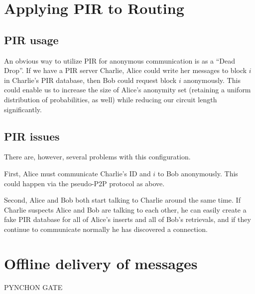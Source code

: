 \documentclass[twocolumn,11pt,english]{article}
\begin{document}
\section{Applying PIR to Routing}
\subsection{PIR usage}
An obvious way to utilize PIR for anonymous communication is as a ``Dead Drop''. If we have a PIR server Charlie, Alice could write her messages to block $i$ in Charlie's PIR database, then Bob could request block $i$ anonymously. This could enable us to increase the size of Alice's anonymity set (retaining a uniform distribution of probabilities, as well) while reducing our circuit length significantly. 

\subsection{PIR issues}
There are, however, several problems with this configuration.

First, Alice must communicate Charlie's ID and $i$ to Bob anonymously. This could happen via the pseudo-P2P protocol as above. 

Second, Alice and Bob both start talking to Charlie around the same time. If Charlie suspects Alice and Bob are talking to each other, he can easily create a fake PIR database for all of Alice's inserts and all of Bob's retrievals, and if they continue to communicate normally he has discovered a connection. 

\section{Offline delivery of messages}
 PYNCHON GATE
\end{document}
